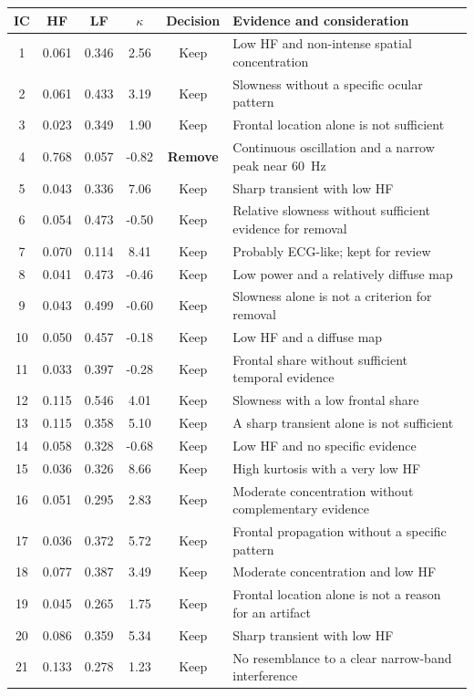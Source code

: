 \begin{center}
\small
\begin{longtable}{@{}cccccp{6.4cm}@{}}
\toprule
\textbf{IC} & \textbf{HF} & \textbf{LF} & $\kappa$ & \textbf{Decision} & \textbf{Evidence and consideration}\\
\midrule
\endhead
1 & 0.061 & 0.346 & 2.56 & Keep & Low HF and non-intense spatial concentration\\
2 & 0.061 & 0.433 & 3.19 & Keep & Slowness without a specific ocular pattern\\
3 & 0.023 & 0.349 & 1.90 & Keep & Frontal location alone is not sufficient\\
4 & 0.768 & 0.057 & -0.82 & \textcolor{accent}{\textbf{Remove}} & Continuous oscillation and a narrow peak near 60~Hz\\
5 & 0.043 & 0.336 & 7.06 & Keep & Sharp transient with low HF\\
6 & 0.054 & 0.473 & -0.50 & Keep & Relative slowness without sufficient evidence for removal\\
7 & 0.070 & 0.114 & 8.41 & Keep & Probably ECG-like; kept for review\\
8 & 0.041 & 0.473 & -0.46 & Keep & Low power and a relatively diffuse map\\
9 & 0.043 & 0.499 & -0.60 & Keep & Slowness alone is not a criterion for removal\\
10 & 0.050 & 0.457 & -0.18 & Keep & Low HF and a diffuse map\\
11 & 0.033 & 0.397 & -0.28 & Keep & Frontal share without sufficient temporal evidence\\
12 & 0.115 & 0.546 & 4.01 & Keep & Slowness with a low frontal share\\
13 & 0.115 & 0.358 & 5.10 & Keep & A sharp transient alone is not sufficient\\
14 & 0.058 & 0.328 & -0.68 & Keep & Low HF and no specific evidence\\
15 & 0.036 & 0.326 & 8.66 & Keep & High kurtosis with a very low HF\\
16 & 0.051 & 0.295 & 2.83 & Keep & Moderate concentration without complementary evidence\\
17 & 0.036 & 0.372 & 5.72 & Keep & Frontal propagation without a specific pattern\\
18 & 0.077 & 0.387 & 3.49 & Keep & Moderate concentration and low HF\\
19 & 0.045 & 0.265 & 1.75 & Keep & Frontal location alone is not a reason for an artifact\\
20 & 0.086 & 0.359 & 5.34 & Keep & Sharp transient with low HF\\
21 & 0.133 & 0.278 & 1.23 & Keep & No resemblance to a clear narrow-band interference\\
\bottomrule
\end{longtable}
\end{center}

